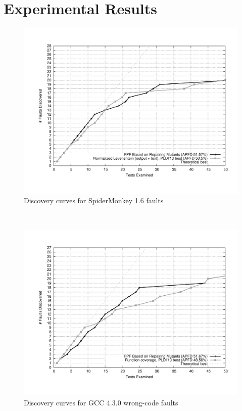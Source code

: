 \section{Experimental Results}

\begin{figure}
    \centering
        \includegraphics[width=1.0\textwidth]{jscurve}
        \caption{Discovery curves for SpiderMonkey 1.6 faults}
        \label{jscurves}
 \end{figure}%
    ~ 
    \begin{figure}
        \centering
        \includegraphics[width=1.0\textwidth]{gcccurve}
        \caption{Discovery curves for GCC 4.3.0 wrong-code faults}
        \label{gcccurves}
\end{figure}


